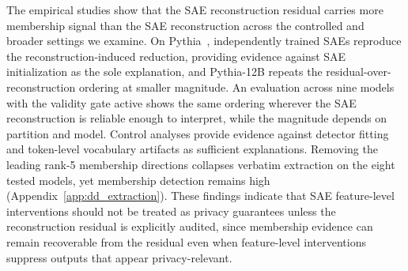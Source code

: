 The empirical studies show that the SAE reconstruction residual carries more membership signal than the SAE reconstruction across the controlled and broader settings we examine. On Pythia~\citep{biderman2023pythia}, independently trained SAEs reproduce the reconstruction-induced reduction, providing evidence against SAE initialization as the sole explanation, and Pythia-12B repeats the residual-over-reconstruction ordering at smaller magnitude. An evaluation across nine models with the validity gate active shows the same ordering wherever the SAE reconstruction is reliable enough to interpret, while the magnitude depends on partition and model. Control analyses provide evidence against detector fitting and token-level vocabulary artifacts as sufficient explanations. Removing the leading rank-5 membership directions collapses verbatim extraction on the eight tested models, yet membership detection remains high (Appendix~\ref{app:dd_extraction}). These findings indicate that SAE feature-level interventions should not be treated as privacy guarantees unless the reconstruction residual is explicitly audited, since membership evidence can remain recoverable from the residual even when feature-level interventions suppress outputs that appear privacy-relevant.
